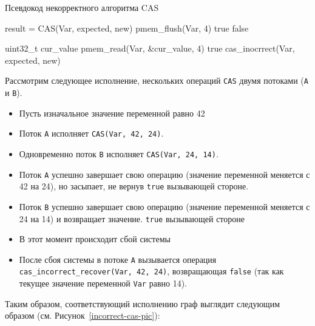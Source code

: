 \documentclass[times,specification,annotation]{itmo-student-thesis}
\begin{document}
\begin{algorithm}[H]
\caption{Псевдокод некорректного алгоритма CAS}
\label{incorrect-cas-algorithm}
\begin{algorithmic}
        \State result = CAS(Var, expected, new)
            \State pmem\_flush(Var, 4)
            \State \Return true 
        \Else 
            \State \Return false
        \EndIf
    \EndFunction
    
    \bigbreak
    \bigbreak
    
        \State uint32\_t cur\_value
        \State pmem\_read(Var, \&cur\_value, 4)
            \State \Return true 
        \Else 
            \State \Return cas\_inocrrect(Var, expected, new)
        \EndIf
    \EndFunction
\end{algorithmic}
\end{algorithm}

Рассмотрим следующее исполнение, нескольких операций \texttt{CAS} двумя потоками (\texttt{A} и \texttt{B}).

\begin{itemize}
    \item Пусть изначальное значение переменной равно 42
    \item Поток \texttt{A} исполняет \texttt{CAS(Var, 42, 24)}.
    \item Одновременно поток \texttt{B} исполняет \texttt{CAS(Var, 24, 14)}.
    \item Поток \texttt{A} успешно завершает свою операцию (значение переменной меняется с 42 на 24), но засыпает, не вернув \texttt{true} вызывающей стороне.
    \item Поток \texttt{B} успешно завершает свою операцию (значение переменной меняется с 24 на 14) и возвращает значение. \texttt{true} вызывающей стороне
    \item В этот момент происходит сбой системы
    \item После сбоя системы в потоке \texttt{A} вызывается операция \texttt{cas\_incorrect\_recover(Var, 42, 24)}, возвращающая \texttt{false} (так как текущее значение переменной \texttt{Var} равно 14).
\end{itemize}

\bigbreak

Таким образом, соответствующий исполнению граф выглядит следующим образом
(см. Рисунок~\ref{incorrect-cas-pic}):
\end{document}
